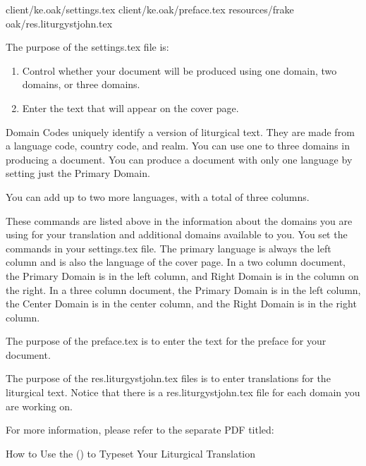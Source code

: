 \documentclass[]{memoir}
\begin{document}
\a client/ke.oak/settings.tex
\a client/ke.oak/preface.tex
\a resources/fra\textunderscore ke \textunderscore oak/res.liturgystjohn.tex
\xe

The purpose of the settings.tex file is:
\begin{enumerate}
\item Control whether your document will be produced using one domain, two domains, or three domains.
\item Enter the text that will appear on the cover page.
\end{enumerate}

Domain Codes uniquely identify a version of liturgical text. They are made from a language code, country code, and realm. You can use one to three domains in producing a document. You can produce a document with only one language by setting just the Primary Domain. 

You can add up to two more languages, with a total of three columns. 

These commands are listed above in the information about the domains you are using for your translation and additional domains available to you. You set the commands in your settings.tex file. The primary language is always the left column and is also the language of the cover page.  In a two column document, the Primary Domain is in the left column, and Right Domain is in the column on the right.  In a three column document, the Primary Domain is in the left column, the Center Domain is in the center column, and the Right Domain is in the right column.

The purpose of the preface.tex is to enter the text for the preface for your document.

The purpose of the res.liturgystjohn.tex files is to enter translations for the liturgical text.  Notice that there is a res.liturgystjohn.tex file for each domain you are working on.

\bigskip
For more information, please refer to the separate PDF titled:
\bigskip

\noindent How to Use the \ltOcmcSystem (\ltOcmcSystemAcronymn) to Typeset Your Liturgical Translation

 
\end{document}
